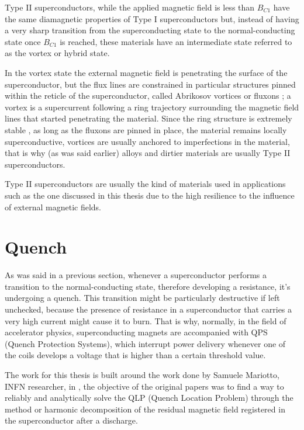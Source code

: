 \medskip

Type II superconductors, while the applied magnetic field is less than $B_{C1}$ have the same
diamagnetic properties of Type I superconductors but, instead of having a very sharp transition from the superconducting state to
the normal-conducting state once $B_{C1}$ is reached, these materials have an intermediate state referred to as the vortex or hybrid
state.

\medskip

In the vortex state the external magnetic field is penetrating the surface of the superconductor, but the
flux lines are constrained in particular structures pinned within the reticle of the
superconductor, called Abrikosov vortices or fluxons \cite{abrikosov-vortices}; a vortex is a supercurrent
following a ring trajectory surrounding the magnetic field lines that started penetrating the
material. Since the ring structure is extremely stable \cite{fujita-theory-HTS}, as long as the
fluxons are pinned in place, the material remains
locally superconductive, vortices are usually anchored to imperfections in the material, that is why
(as was said earlier) alloys and dirtier materials are usually Type II superconductors.

Type II superconductors are usually the kind of materials used in applications such as the one
discussed in this thesis due to the high resilience to the influence of external magnetic fields.

\section{Quench}
As was said in a previous section, whenever a superconductor performs a transition to the
normal-conducting state, therefore developing a resistance, it's undergoing a quench. This
transition might be particularly destructive if left unchecked, because the presence of resistance
in a superconductor that carries a very high current might cause it to burn. That is why, normally,
in the field of accelerator physics, superconducting magnets are accompanied with QPS (Quench
Protection Systems), which interrupt power delivery whenever one of the coils develops a voltage
that is higher than a certain threshold value.

\medskip

The work for this thesis is built around the work done by Samuele Mariotto, INFN researcher, in
\cite{mariotto2022} \cite{mariotto2022-generic}, the objective of the original papers was to find a
way to reliably and analytically solve the QLP (Quench Location Problem) through the method or
harmonic decomposition of the residual magnetic field registered in the superconductor after a
discharge.
